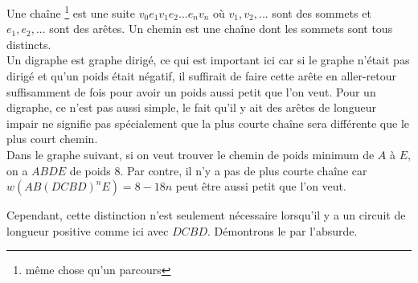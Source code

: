 \begin{solution}
  Une chaîne \footnote{même chose qu'un parcours} est une suite $v_0e_1v_1e_2...e_nv_n $ où $v_1,v_2,...$ sont des sommets et $e_1,e_2,...$ sont des arêtes.
  Un chemin est une chaîne dont les sommets sont tous distincts.\\

  Un digraphe est graphe dirigé, ce qui est important ici car si le graphe n'était pas dirigé et qu'un poids
  était négatif, il suffirait de faire cette arête en aller-retour suffisamment de fois pour avoir un poids
  aussi petit que l'on veut.
  Pour un digraphe, ce n'est pas aussi simple, le fait qu'il y ait des arêtes de longueur impair ne signifie pas
  spécialement que la plus courte chaîne sera différente que le plus court chemin.\\

  Dans le graphe suivant,
  si on veut trouver le chemin de poids minimum de $A$ à $E$, on a $ABDE$ de poids $8$.
  Par contre, il n'y a pas de plus courte chaîne car $w(AB(DCBD)^nE) = 8 - 18n$ peut être aussi
  petit que l'on veut.\\

  \begin{center}
  \end{center}

  Cependant, cette distinction n'est seulement nécessaire lorsqu'il y a
  un circuit de longueur positive comme ici avec $DCBD$.
  Démontrons le par l'absurde.\\


\end{solution}
